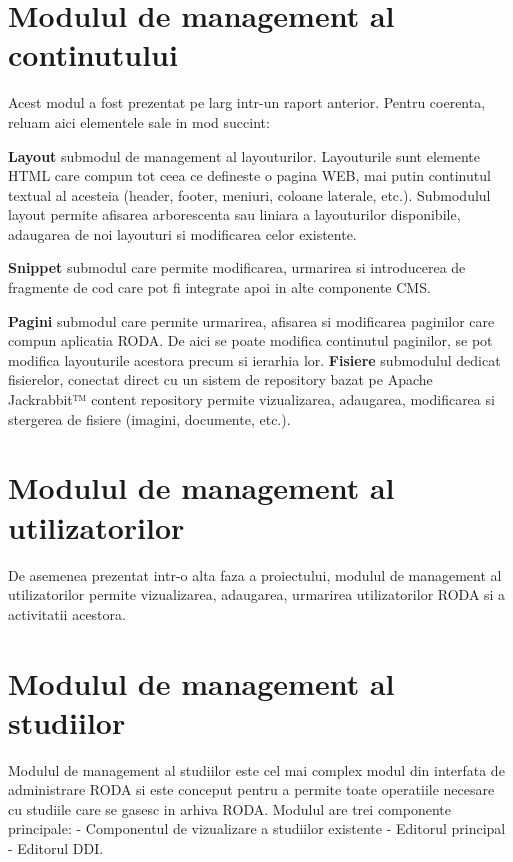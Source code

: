 \section {Modulul de management al continutului}

Acest modul a fost prezentat pe larg intr-un raport anterior. Pentru coerenta, reluam aici elementele sale in mod succint:

\textbf{Layout} submodul de management al layouturilor. Layouturile sunt elemente HTML care compun tot ceea ce defineste o pagina WEB, mai putin continutul textual al acesteia (header, footer, meniuri, coloane laterale, etc.). Submodulul layout permite afisarea arborescenta sau liniara a layouturilor disponibile, adaugarea de noi layouturi si modificarea celor existente.

\textbf{Snippet} submodul care permite modificarea, urmarirea si introducerea de fragmente de cod care pot fi integrate apoi in alte componente CMS. 

\textbf{Pagini} submodul care permite urmarirea, afisarea si modificarea paginilor care compun aplicatia RODA. De aici se poate modifica continutul paginilor, se pot modifica layouturile acestora precum si ierarhia lor.
\textbf{Fisiere} submodulul dedicat fisierelor, conectat direct cu un sistem de repository bazat pe Apache Jackrabbit™ content repository permite vizualizarea, adaugarea, modificarea si stergerea de fisiere (imagini, documente, etc.).


\section {Modulul de management al utilizatorilor}

De asemenea prezentat intr-o alta faza a proiectului, modulul de management al utilizatorilor permite vizualizarea, adaugarea, urmarirea utilizatorilor RODA si a activitatii acestora. 


\section {Modulul de management al studiilor}

Modulul de management al studiilor este cel mai complex modul din interfata de administrare RODA  si este conceput pentru a permite toate operatiile necesare cu studiile care se gasesc in arhiva RODA. Modulul are trei componente principale: 
    - Componentul de vizualizare a studiilor existente
    - Editorul principal
    - Editorul DDI. 

